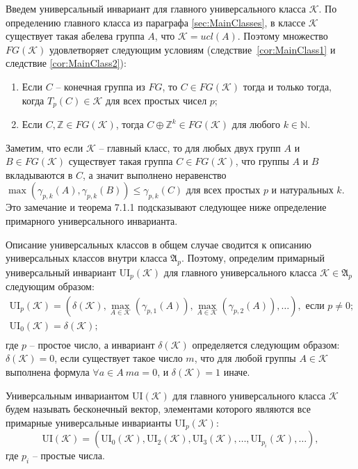 \documentclass[a4paper,11pt,twoside]{article}
\def\A{{\mathfrak{A}}}
\def\K{{\mathcal{K}}}
\def\Z{{\mathbb{Z}}}
\def\N{{\mathbb{N}}}
\def\ui{{\mathrm{UI}}}
\begin{document}
Введем универсальный инвариант для главного универсального класса $\K$. По определению главного класса из параграфа \ref{sec:MainClasses}, в классе $\K$ существует такая абелева группа $A$, что $\K = ucl(A).$ Поэтому множество $FG(\K)$ удовлетворяет следующим условиям (следствие~\ref{cor:MainClass1} и следствие \ref{cor:MainClass2}):
\begin{enumerate}
\item Если $C$ -- конечная группа из $FG$, то $C \in FG(\K)$ тогда и только тогда, когда $T_p(C) \in \K$ для всех простых чисел $p$;
\item Если $C, \Z \in FG(\K)$, тогда $C \oplus \Z^k \in FG(\K)$ для любого $k \in \N.$
\end{enumerate}

Заметим, что если $\K$ -- главный класс, то для любых двух групп $A$ и $B \in FG(\K)$ существует такая группа $C \in FG(\K)$, что группы $A$ и $B$ вкладываются в $C$, а значит выполнено неравенство $\max(\gamma_{p,k}(A), \gamma_{p,k}(B)) \leq \gamma_{p,k}(C)$ для всех простых $p$ и натуральных $k$. Это замечание и теорема 7.1.1 \cite{Hodges} подсказывают следующее ниже определение примарного универсального инварианта.

Описание универсальных классов в общем случае сводится к описанию универсальных классов внутри класса $\A_p$. Поэтому, определим примарный универсальный инвариант $\ui_p(\K)$ для главного универсального класса $\K \in \A_p$ следующим образом:
$$\begin{array}{c}
\ui_p(\K) = (\delta(\K),  \max\limits_{A \in \K}(\gamma_{p,1}(A)), \max\limits_{A \in \K}(\gamma_{p,2}(A)), \ldots), \text{ если } p \neq 0; \\
\ui_0(\K) = \delta(\K); \\
\end{array}$$
где $p$ -- простое число, а инвариант $\delta(\K)$ определяется следующим образом: $\delta(\K) = 0$, если существует такое число $m$, что для любой группы $A \in \K$ выполнена формула $\forall a \in A \ ma=0$, и $\delta(\K) = 1$ иначе.



Универсальным инвариантом $\ui(\K)$ для главного универсального класса $\K$ будем называть бесконечный вектор, элементами которого являются все примарные универсальные инварианты $\ui_p(\K)$:
$$\ui(\K) = (\ui_0(\K), \ui_2(\K), \ui_3(\K), \ldots, \ui_{p_i}(\K), \ldots ),$$
где $p_i$ -- простые числа.
\end{document}
